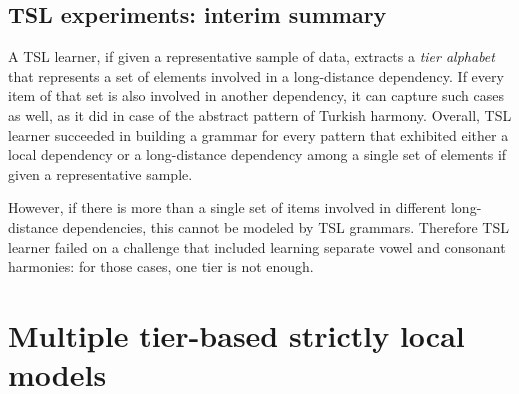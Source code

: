 \begin{table}[h!]
\centering
{}
\caption{TSL learning of first-last harmony; abstract representation.}
\end{table}



\subsection{TSL experiments: interim summary}

A TSL learner, if given a representative sample of data, extracts a \emph{tier alphabet} that represents a set of elements involved in a long-distance dependency.
If every item of that set is also involved in another dependency, it can capture such cases as well, as it did in case of the abstract pattern of Turkish harmony.
Overall, TSL learner succeeded in building a grammar for every pattern that exhibited either a local dependency or a long-distance dependency among a single set of elements if given a representative sample.

However, if there is more than a single set of items involved in different long-distance dependencies, this cannot be modeled by TSL grammars.
Therefore TSL learner failed on a challenge that included learning separate vowel and consonant harmonies: for those cases, one tier is not enough.


\section{Multiple tier-based strictly local models}

